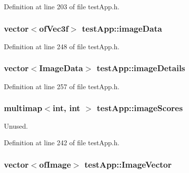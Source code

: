 Definition at line 203 of file test\-App.\-h.

\hypertarget{classtest_app_a500cd1228b3364bf30c8fb185e375688}{
\subsubsection[{image\-Data}]{\setlength{\rightskip}{0pt plus 5cm}vector$<$of\-Vec3f$>$ test\-App\-::image\-Data}}\label{classtest_app_a500cd1228b3364bf30c8fb185e375688}


Definition at line 248 of file test\-App.\-h.

\hypertarget{classtest_app_adcd4c3dfc7257326a79e6a3fc8b33406}{
\subsubsection[{image\-Details}]{\setlength{\rightskip}{0pt plus 5cm}vector$<${\bf Image\-Data}$>$ test\-App\-::image\-Details}}\label{classtest_app_adcd4c3dfc7257326a79e6a3fc8b33406}


Definition at line 257 of file test\-App.\-h.

\hypertarget{classtest_app_a9ced1a64554a911109fe8a975b95b590}{
\subsubsection[{image\-Scores}]{\setlength{\rightskip}{0pt plus 5cm}multimap$<$int, int $>$ test\-App\-::image\-Scores}}\label{classtest_app_a9ced1a64554a911109fe8a975b95b590}


Unused. 



Definition at line 242 of file test\-App.\-h.

\hypertarget{classtest_app_ad4de5d6e6e8f3b8bb7424e62792deb1f}{
\subsubsection[{Image\-Vector}]{\setlength{\rightskip}{0pt plus 5cm}vector$<$of\-Image$>$ test\-App\-::\-Image\-Vector}}\label{classtest_app_ad4de5d6e6e8f3b8bb7424e62792deb1f}


